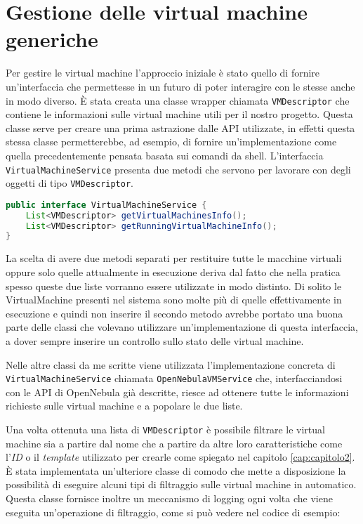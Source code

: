 \section{Gestione delle virtual machine generiche}
Per gestire le virtual machine l'approccio iniziale è stato quello di fornire un'interfaccia che permettesse in un futuro di poter interagire con le stesse anche in modo diverso.
È stata creata una classe wrapper chiamata \texttt{VMDescriptor} che contiene le informazioni sulle virtual machine utili per il nostro progetto. Questa classe serve per creare una prima astrazione dalle API utilizzate, in effetti questa stessa classe permetterebbe, ad esempio, di fornire un'implementazione come quella precedentemente pensata basata sui comandi da shell.
L'interfaccia \texttt{VirtualMachineService} presenta due metodi che servono per lavorare con degli oggetti di tipo \texttt{VMDescriptor}.
\begin{lstlisting}[language=Java, caption=VirtualMachineService, label=code:VirtualMachineService, xleftmargin=1em]
public interface VirtualMachineService {
    List<VMDescriptor> getVirtualMachinesInfo();
    List<VMDescriptor> getRunningVirtualMachineInfo();
}
\end{lstlisting}
La scelta di avere due metodi separati per restituire tutte le macchine virtuali oppure solo quelle attualmente in esecuzione deriva dal fatto che nella pratica spesso queste due liste vorranno essere utilizzate in modo distinto. Di solito le VirtualMachine presenti nel sistema sono molte più di quelle effettivamente in esecuzione e quindi non inserire il secondo metodo avrebbe portato una buona parte delle classi che volevano utilizzare un'implementazione di questa interfaccia, a dover sempre inserire un controllo sullo stato delle virtual machine.\par
Nelle altre classi da me scritte viene utilizzata l'implementazione concreta di \texttt{VirtualMachineService} chiamata \texttt{OpenNebulaVMService} che, interfacciandosi con le API di OpenNebula già descritte, riesce ad ottenere tutte le informazioni richieste sulle virtual machine e a popolare le due liste.\par
Una volta ottenuta una lista di \texttt{VMDescriptor} è possibile filtrare le virtual machine sia a partire dal nome che a partire da altre loro caratteristiche come l'\emph{ID} o il \emph{template} utilizzato per crearle come spiegato nel capitolo \ref{cap:capitolo2}.
È stata implementata un'ulteriore classe di comodo che mette a disposizione la possibilità di eseguire alcuni tipi di filtraggio sulle virtual machine in automatico. Questa classe fornisce inoltre un meccanismo di logging ogni volta che viene eseguita un'operazione di filtraggio, come si può vedere nel codice di esempio:
